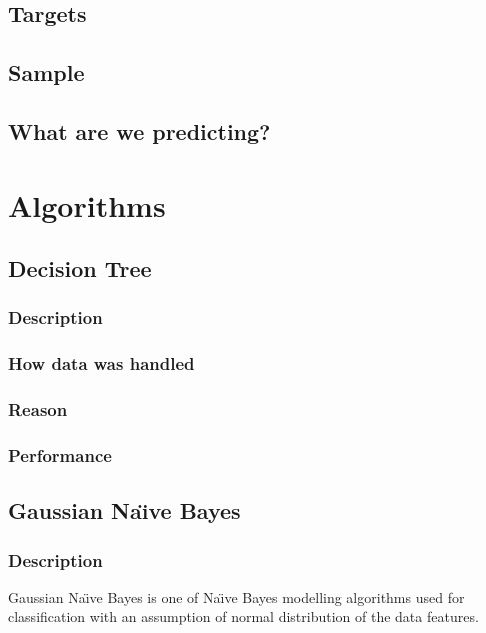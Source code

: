 \documentclass[12pt]{article}
\begin{document}
	\subsection{Targets}
	\subsection{Sample}
	\subsection{What are we predicting?}
	\newpage
	
	\section{Algorithms}
	\subsection{Decision Tree}
	\subsubsection{Description}
	\subsubsection{How data was handled}
	\subsubsection{Reason}
	\subsubsection{Performance}
	\newpage
	\subsection{Gaussian Na\"{\i}ve Bayes}
	\subsubsection{Description}
	Gaussian Na\"{\i}ve Bayes is one of Na\"{\i}ve Bayes modelling algorithms used for classification with an assumption of normal distribution of the data features.
\end{document}
